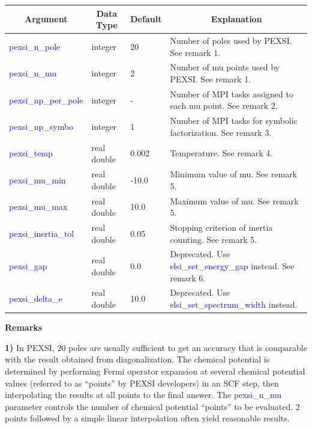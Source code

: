 \documentclass{report}
\begin{document}
\begin{tabular}[]{|p{30mm}|p{20mm}|p{15mm}|p{100mm}|}
\hline
\multicolumn{1}{|c|}{\textbf{Argument}} & \multicolumn{1}{c|}{\textbf{Data Type}} & \multicolumn{1}{c|}{\textbf{Default}} & \multicolumn{1}{c|}{\textbf{Explanation}}\\
\hline
\textcolor{blue}{pexsi\_n\_pole}          & integer     & 20    & Number of poles used by PEXSI.  See remark 1.\\
\hline
\textcolor{blue}{pexsi\_n\_mu}            & integer     & 2     & Number of mu points used by PEXSI.  See remark 1.\\
\hline
\textcolor{blue}{pexsi\_np\_per\_pole}    & integer     & -     & Number of MPI tasks assigned to each mu point.  See remark 2.\\
\hline
\textcolor{blue}{pexsi\_np\_symbo}        & integer     & 1     & Number of MPI tasks for symbolic factorization.  See remark 3.\\
\hline
\textcolor{blue}{pexsi\_temp}             & real double & 0.002 & Temperature.  See remark 4.\\
\hline
\textcolor{blue}{pexsi\_mu\_min}          & real double & -10.0 & Minimum value of mu.  See remark 5.\\
\hline
\textcolor{blue}{pexsi\_mu\_max}          & real double & 10.0  & Maximum value of mu.  See remark 5.\\
\hline
\textcolor{blue}{pexsi\_inertia\_tol}     & real double & 0.05  & Stopping criterion of inertia counting.  See remark 5.\\
\hline
\textcolor{blue}{pexsi\_gap}              & real double & 0.0   & Deprecated.  Use \textcolor{blue}{elsi\_set\_energy\_gap} instead.  See remark 6.\\
\hline
\textcolor{blue}{pexsi\_delta\_e}         & real double & 10.0  & Deprecated.  Use \textcolor{blue}{elsi\_set\_spectrum\_width} instead.\\
\hline
\end{tabular}

\textbf{Remarks}

\textbf{1)} In PEXSI, 20 poles are usually sufficient to get an accuracy that is comparable with the result obtained from diagonalization.  The chemical potential is determined by performing Fermi operator expansion at several chemical potential values (referred to as ``points'' by PEXSI developers) in an SCF step, then interpolating the results at all points to the final answer.  The \textcolor{blue}{pexsi\_n\_mu} parameter controls the number of chemical potential ``points'' to be evaluated.  2 points followed by a simple linear interpolation often yield reasonable results.
\end{document}
